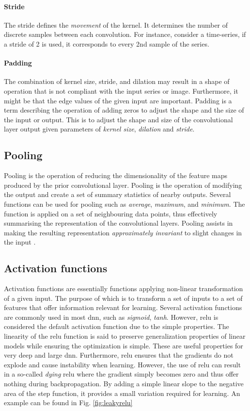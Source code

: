 \paragraph{Stride}
The stride defines the \textit{movement} of the kernel. It determines the number of discrete samples between each convolution. For instance, consider a time-series, if a stride of 2 is used, it corresponds to every 2nd sample of the series. 

\paragraph{Padding}
The combination of kernel size, stride, and dilation may result in a shape of operation that is not compliant with the input series or image. Furthermore, it might be that the edge values of the given input are important. Padding is a term describing the operation of adding zeros to adjust the shape and the size of the input or output. This is to adjust the shape and size of the convolutional layer output given parameters of \emph{kernel size}, \emph{dilation} and \emph{stride}.

\subsection{Pooling}
Pooling is the operation of reducing the dimensionality of the feature maps produced by the prior convolutional layer. Pooling is the operation of modifying the output and create a set of summary statistics of nearby outputs. Several functions can be used for pooling such as \emph{average}, \emph{maximum}, and \emph{minimum}. The function is applied on a set of neighbouring data points, thus effectively summarising the representation of the convolutional layers. Pooling assists in making the resulting representation \emph{approximately invariant} to slight changes in the input \cite{Goodfellow-et-al-2016}.


\subsection{Activation functions}
Activation functions are essentially functions applying non-linear transformation of a given input. The purpose of which is to transform a set of inputs to a set of features that offer information relevant for learning. Several activation functions are commonly used in most \gls{dnn}, such as \emph{sigmoid}, \emph{tanh}. However, \gls{relu} is considered the default activation function due to the simple properties. The linearity of the \gls{relu} function is said to preserve generalization properties of linear models while ensuring the optimization is simple. These are useful properties for very deep and large \gls{dnn}. Furthermore, \gls{relu} ensures that the gradients do not explode and cause instability when learning. However, the use of \gls{relu} can result in a so-called \emph{dying} \gls{relu} where the gradient simply becomes zero and thus offer nothing during backpropagation. By adding a simple linear slope to the negative area of the step function, it provides a small variation required for learning. An example can be found in Fig. \ref{fig:leakyrelu}

